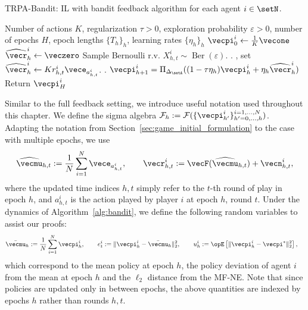 \begin{algorithm}
    \caption{TRPA-Bandit: IL with bandit feedback algorithm for each agent $i\in\setN$.}\label{alg:bandit}
    \begin{algorithmic}
    \Require Number of actions $K$, regularization $\tau > 0$, exploration probability $\varepsilon > 0$, number of epochs $H$, epoch lengths $\{T_h\}_h$, learning rates $\{\eta_h\}_h$
    \State $\vecpi^i_0 \leftarrow \frac{1}{K} \vecone$
    \State $\widehat{\vecr}^i_h \leftarrow \veczero$ %
     
    \State Sample Bernoulli r.v. $X_{h,t}^i \sim \operatorname{Ber}(\varepsilon)$.
        \State {}.
        \State {}, set  $\widehat{\vecr}^i_h \leftarrow K r^i_{h,t}\vece_{a^i_{h,t}}$.
        \State {}.
    \EndIf
    \EndFor
    \State $\vecpi^i_{h+1} = \Pi_{\Delta_\setA} ( (1 - \tau \eta_h) \vecpi^i_h + \eta_h \widehat{\vecr}^i_h )$
    \EndFor
    \State Return $\vecpi^i_H$
    \end{algorithmic}
    \end{algorithm}



Similar to the full feedback setting, we introduce useful notation used throughout this chapter.
We define the sigma algebra $\mathcal{F}_{h} := \mathcal{F}(\{ \vecpi_{h'}^i \}_{h'=0, \ldots, h}^{i=1, \ldots, N})$.
Adapting the notation from Section~\ref{sec:game_initial_formulation} to the case with multiple epochs, we use
\begin{align*}
\widehat{\vecmu}_{h, t} := \frac{1}{N} \sum_{i=1}^N \vece_{a_{h, t}^i}, \qquad
    \vecr^i_{h, t} := \vecF(\widehat{\vecmu}_{h, t}) + \vecn_{h, t}^i,
\end{align*}
where the updated time indices $h, t$ simply refer to the $t$-th round of play in epoch $h$, and $a_{h, t}^i$ is the action played by player $i$ at epoch $h$, round $t$.
Under the dynamics of Algorithm~\ref{alg:bandit}, we define the following random variables to assist our proofs:
\begin{align*}
    \bar{\vecmu}_h &:= \frac{1}{N} \sum_{i=1}^N \vecpi_h^i, 
    \qquad
    e_t^i := \|\vecpi^i_h - \bar{\vecmu}_h \|_2^2, 
    \qquad
    u_h^i := \Exop\left[\| \vecpi_h^i - \vecpi^* \|_2^2\right],
\end{align*}
which correspond to the mean policy at epoch $h$, the policy deviation of agent $i$ from the mean at epoch $h$ and the $\ell_2$ distance from the MF-NE.
Note that since policies are updated only in between epochs, the above quantities are indexed by epochs $h$ rather than rounds $h, t$.

